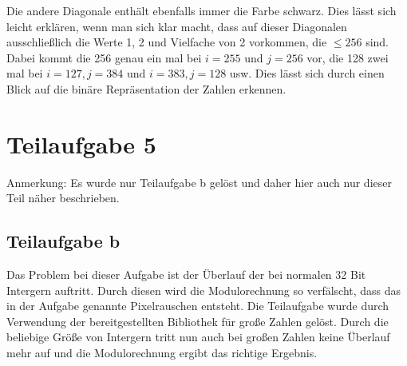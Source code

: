 \documentclass[]{article}
\begin{document}
Die andere Diagonale enthält ebenfalls immer die Farbe schwarz. Dies lässt sich leicht erklären, wenn man sich klar macht, dass auf dieser Diagonalen ausschließlich die Werte 1, 2 und Vielfache von 2 vorkommen, die $\leq 256$ sind. Dabei kommt die 256 genau ein mal bei $i = 255$ und $j = 256$ vor, die 128 zwei mal bei $i = 127, j = 384$ und $i = 383, j = 128$ usw. Dies lässt sich durch einen Blick auf die binäre Repräsentation der Zahlen erkennen. 
\section{Teilaufgabe 5}
Anmerkung: Es wurde nur Teilaufgabe b gelöst und daher hier auch nur dieser Teil näher beschrieben.
\subsection{Teilaufgabe b}
Das Problem bei dieser Aufgabe ist der Überlauf der bei normalen 32 Bit Intergern auftritt. Durch diesen wird die Modulorechnung so verfälscht, dass das in der Aufgabe genannte Pixelrauschen entsteht. 
Die Teilaufgabe wurde durch Verwendung der bereitgestellten Bibliothek für große Zahlen gelöst. Durch die beliebige Größe von Intergern tritt nun auch bei großen Zahlen keine Überlauf mehr auf und die Modulorechnung ergibt das richtige Ergebnis. 
\end{document}
